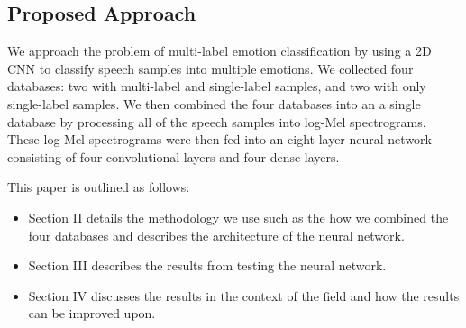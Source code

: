 \documentclass[conference]{IEEEtran}
\begin{document}
\subsection{Proposed Approach}

We approach the problem of multi-label emotion classification by using a 2D CNN to classify speech samples into multiple emotions. We collected four databases: two with multi-label and single-label samples, and two with only single-label samples. We then combined the four databases into an a single database by processing all of the speech samples into log-Mel spectrograms. These log-Mel spectrograms were then fed into an eight-layer neural network consisting of four convolutional layers and four dense layers.

This paper is outlined as follows:
\begin{itemize}
	\item Section II details the methodology we use such as the how we combined the four databases and describes the architecture of the neural network.
	\item Section III describes the results from testing the neural network.
	\item Section IV discusses the results in the context of the field and how the results can be improved upon.
\end{itemize}
\end{document}
